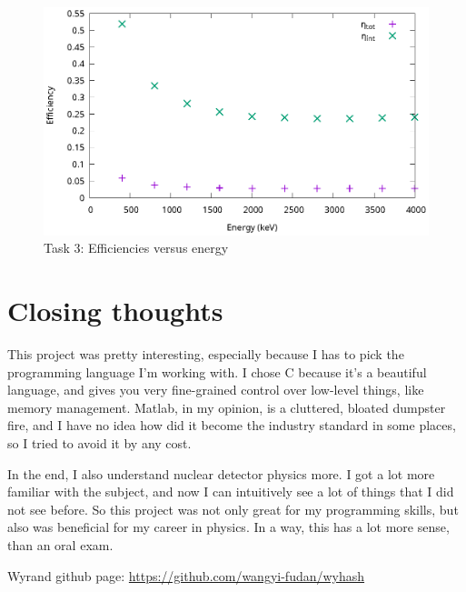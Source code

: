 \documentclass[a4paper,12pt]{article}
\begin{document}
\begin{figure}[h!]
\centering
\includegraphics[width=\textwidth]{./3.eps}
\caption{Task 3: Efficiencies versus energy}
\label{fig:eff2}
\end{figure}

\newpage

\section{Closing thoughts}
This project was pretty interesting, especially because I has to pick the programming language I'm working with. I chose C because it's a beautiful language, and gives you very fine-grained control over low-level things, like memory management. Matlab, in my opinion, is a cluttered, bloated dumpster fire, and I have no idea how did it become the industry standard in some places, so I tried to avoid it by any cost.

In the end, I also understand nuclear detector physics more. I got a lot more familiar with the subject, and now I can intuitively see a lot of things that I did not see before. So this project was not only great for my programming skills, but also was beneficial for my career in physics. In a way, this has a lot more sense, than an oral exam.

\begin{thebibliography}{1}
 Wyrand github page: \href{https://github.com/wangyi-fudan/wyhash}{https://github.com/wangyi-fudan/wyhash}
\end{thebibliography}
\end{document}

